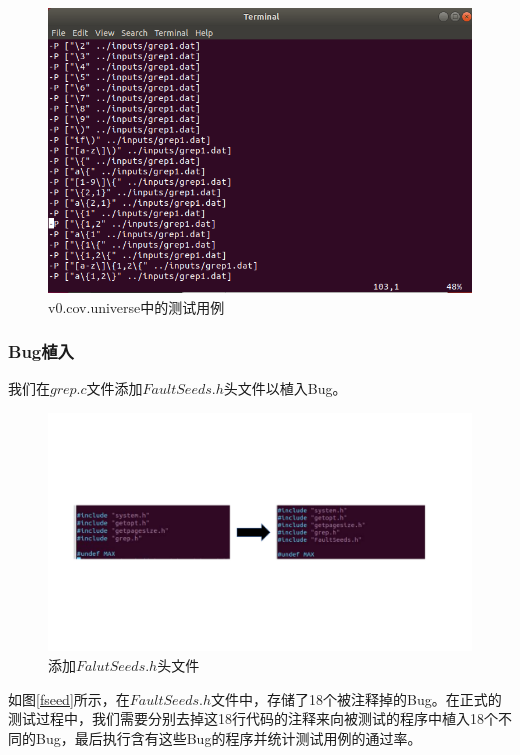 \documentclass[12pt, a4paper, oneside,bibend=bibtex]{ctexart}
\begin{document}
\begin{figure}[htbp]
    \centering
    \includegraphics[width=14cm]{images/universe.png}
    \caption{v0.cov.universe中的测试用例}
    \label{universe}
\end{figure}

\subsubsection{Bug植入}
我们在$grep.c$文件添加$FaultSeeds.h$头文件以植入Bug。
\begin{figure}[htbp]
    \centering
    \includegraphics[width=14cm]{images/insert1.pdf}
    \caption{添加$FalutSeeds.h$头文件}
    \label{insert}
\end{figure}

如图\ref{fseed}所示，在$FaultSeeds.h$文件中，存储了18个被注释掉的Bug。在正式的测试过程中，我们需要分别去掉这18行代码的注释来向被测试的程序中植入18个不同的Bug，最后执行含有这些Bug的程序并统计测试用例的通过率。
\end{document}
